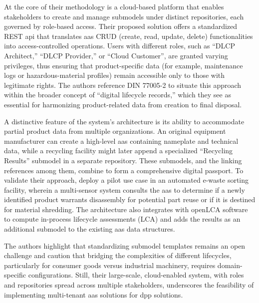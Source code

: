 At the core of their methodology is a cloud-based platform that enables stakeholders to create and manage submodels under distinct repositories, each governed by role-based access. Their proposed solution offers a standardized REST \ac{api} that translates \ac{aas} CRUD (create, read, update, delete) functionalities into access-controlled operations. Users with different roles, such as “DLCP Architect,” “DLCP Provider,” or “Cloud Customer”, are granted varying privileges, thus ensuring that product-specific data (for example, maintenance logs or hazardous-material profiles) remain accessible only to those with legitimate rights. The authors reference DIN 77005-2 to situate this approach within the broader concept of “digital lifecycle records,” which they see as essential for harmonizing product-related data from creation to final disposal. \autocite{Pourjafarian.2023}

A distinctive feature of the system’s architecture is its ability to accommodate partial product data from multiple organizations. An original equipment manufacturer can create a high-level \ac{aas} containing nameplate and technical data, while a recycling facility might later append a specialized “Recycling Results” submodel in a separate repository. These submodels, and the linking references among them, combine to form a comprehensive digital passport. To validate their approach, \textcite{Pourjafarian.2023} deploy a pilot use case in an automated e-waste sorting facility, wherein a multi-sensor system consults the \ac{aas} to determine if a newly identified product warrants disassembly for potential part reuse or if it is destined for material shredding. The architecture also integrates with openLCA software to compute in-process lifecycle assessments (LCA) and adds the results as an additional submodel to the existing \ac{aas} data structures. \autocite{Pourjafarian.2023}

The authors highlight that standardizing submodel templates remains an open challenge and caution that bridging the complexities of different lifecycles, particularly for consumer goods versus industrial machinery, requires domain-specific configurations. Still, their large-scale, cloud-enabled system, with roles and repositories spread across multiple stakeholders, underscores the feasibility of implementing multi-tenant \ac{aas} solutions for \ac{dpp} solutions. \autocite{Pourjafarian.2023}

